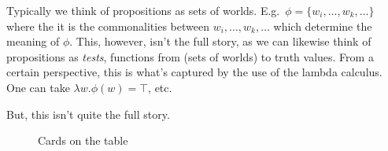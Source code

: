 \documentclass[10pt]{article}
\begin{document}
Typically we think of propositions as sets of worlds.
E.g.\ \(\phi = \{w_{i}, \dots, w_{k}, \dots\}\) where the it is the commonalities between \(w_{i}, \dots, w_{k}, \dots\) which determine the meaning of \(\phi\).
This, however, isn't the full story, as we can likewise think of propositions as \emph{tests}, functions from (sets of worlds) to truth values.
From a certain perspective, this is what's captured by the use of the lambda calculus.
One can take \(\lambda w.\phi(w) = \top\), etc.\

But, this isn't quite the full story.


\begin{figure}[h]
  \centering
  \caption{Cards on the table}
  \label{fig:cards}
\end{figure}



\newpage
\printbibliography
\end{document}
